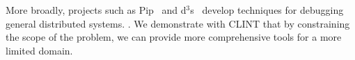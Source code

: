 More broadly, projects such as Pip~\cite{pip} and d$^3$s~\cite{d3s} develop
techniques for debugging general distributed systems. . We demonstrate with CLINT that by constraining the scope of the problem,
we can provide more comprehensive tools for a more limited domain. 





